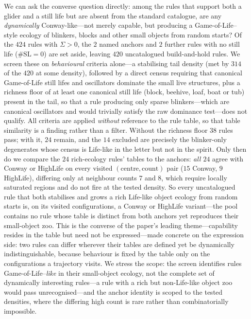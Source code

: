 \documentclass{article}
\begin{document}
We can ask the converse question directly: among the rules that support both a
glider and a still life but are absent from the standard catalogue, are any
\emph{dynamically} Conway-like---not merely capable, but producing a
Game-of-Life--style ecology of blinkers, blocks and other small objects from
random starts? Of the $424$ rules with $\Sigma>0$, the $2$ named anchors and $2$
further rules with no still life ($\#\mathrm{SL}=0$) are set aside, leaving $420$
uncatalogued build-and-hold rules. We screen these on \emph{behavioural} criteria
alone---a stabilising tail density (met by $314$ of the $420$ at some density),
followed by a direct census requiring that canonical Game-of-Life still lifes and
oscillators dominate the small live structures, plus a richness floor of at
least one canonical still life (block, beehive, loaf, boat or tub) present in
the tail, so that a rule producing only sparse blinkers---which are canonical
oscillators and would trivially satisfy the raw dominance test---does not
qualify. All criteria are applied \emph{without}
reference to the rule table, so that table similarity is a finding rather than a
filter. Without the richness floor $38$ rules pass; with it, $24$
remain, and the $14$ excluded are precisely the blinker-only degenerates whose
census is Life-like in the letter but not in the spirit. Only then do we compare
the $24$ rich-ecology rules' tables to the anchors: \emph{all $24$} agree with
Conway or HighLife on every visited
$(\text{centre},\text{count})$ pair ($15$ Conway, $9$ HighLife), differing only at
neighbour counts $7$ and $8$, which require locally saturated regions and do not
fire at the tested density. So every uncatalogued
rule that both stabilises and grows a rich Life-like object ecology from random
starts is, on its visited configurations, a Conway or HighLife variant---the
pool contains no rule whose table is distinct from both anchors yet reproduces
their small-object zoo. This is the converse of the paper's
leading theme---capability resides in the table but need not be
expressed---made concrete on the expression side: two rules can differ wherever
their tables are defined yet be dynamically indistinguishable, because behaviour
is fixed by the table only on the configurations a trajectory visits. We stress
the scope: the screen identifies rules Game-of-Life--\emph{like} in their small-object
ecology, not the complete set of dynamically interesting rules---a rule with a rich
but non-Life-like object zoo would pass unrecognised---and the anchor identity is
scoped to the tested densities, where the differing high count is rare rather than
combinatorially impossible.
\end{document}
